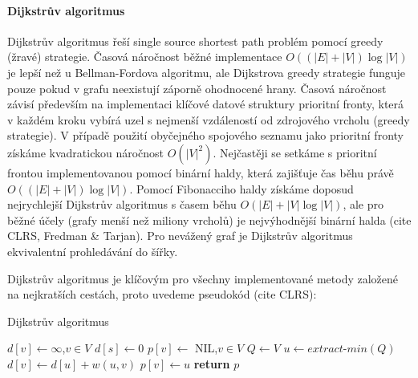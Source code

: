\documentclass[12pt,titlepage]{report}
\begin{document}
\paragraph{Dijkstrův algoritmus}
Dijkstrův algoritmus řeší single source shortest path problém pomocí greedy
(žravé) strategie. Časová náročnost běžné implementace $O((|E| + |V|)\log|V|)$
je lepší než u Bellman-Fordova algoritmu, ale Dijkstrova greedy strategie
funguje pouze pokud v grafu neexistují záporně ohodnocené hrany. Časová
náročnost závisí především na implementaci klíčové datové struktury prioritní
fronty, která v každém kroku vybírá uzel s nejmenší vzdáleností od zdrojového
vrcholu (greedy strategie). V případě použití obyčejného spojového seznamu jako
prioritní fronty získáme kvadratickou náročnost $O(|V|^2)$. Nejčastěji se
setkáme s prioritní frontou implementovanou pomocí binární haldy, která
zajišťuje čas běhu právě $O((|E| + |V|)\log|V|)$. Pomocí Fibonacciho haldy
získáme doposud nejrychlejší Dijkstrův algoritmus s časem běhu $O(|E| + |V|
\log|V|)$, ale pro běžné účely (grafy menší než miliony vrcholů) je
nejvýhodnější binární halda (cite CLRS, Fredman \& Tarjan). Pro nevážený graf
je Dijkstrův algoritmus ekvivalentní prohledávání do šířky.

Dijkstrův algoritmus je klíčovým pro všechny implementované metody založené na
nejkratších cestách, proto uvedeme pseudokód (cite CLRS):

\begin{center}
\begin{minipage}{\textwidth}
\begin{algorithm}[H]
	\caption{Dijkstrův algoritmus}
		\label{alg:dijkstra}
	\begin{algorithmic}[1]
	\Statex
	  
		\State $d[v] \gets \infty$,$v \in V$
		\State $d[s] \gets 0$
		\State $p[v] \gets $ NIL,$v \in V$
		\State $Q \gets V$
			\State $u \gets extract\mbox{-}min(Q)$
					\State $d[v] \gets d[u] + w(u, v)$
					\State $p[v] \gets u$
				\EndIf
			\EndFor
		\EndWhile
		\State \textbf{return} $p$
	\EndFunction
	\end{algorithmic}
\end{algorithm}
\end{minipage}
\end{center}
\mbox{}
\end{document}
